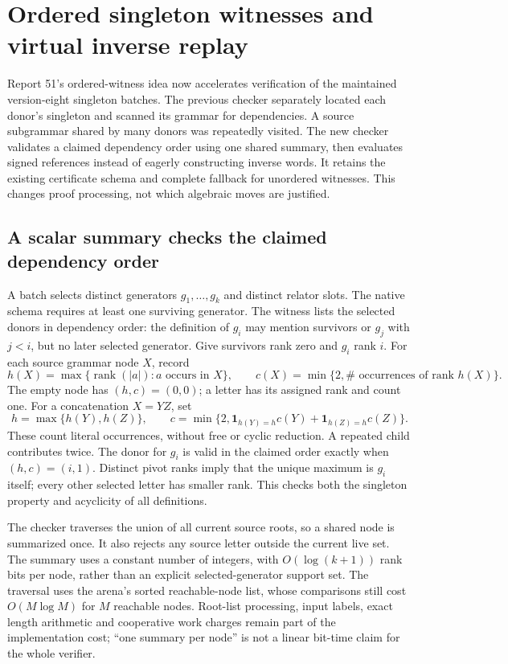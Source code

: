 \section{Ordered singleton witnesses and virtual inverse replay}
\label{sec:ordered-batch}

Report 51's ordered-witness idea now accelerates verification of the maintained
version-eight singleton batches. The previous checker separately located each
donor's singleton and scanned its grammar for dependencies. A source subgrammar
shared by many donors was repeatedly visited. The new checker validates a
claimed dependency order using one shared summary, then evaluates signed
references instead of eagerly constructing inverse words. It retains the
existing certificate schema and complete fallback for unordered witnesses.
This changes proof processing, not which algebraic moves are justified.

\subsection{A scalar summary checks the claimed dependency order}

A batch selects distinct generators $g_1,\ldots,g_k$ and distinct relator slots.
The native schema requires at least one surviving generator. The witness lists
the selected donors in dependency order: the definition of $g_i$ may mention
survivors or $g_j$ with $j<i$, but no later selected generator. Give survivors
rank zero and $g_i$ rank $i$. For each source grammar node $X$, record
\[
 h(X)=\max\{\operatorname{rank}(|a|):a\text{ occurs in }X\},\qquad
 c(X)=\min\{2,\#\text{ occurrences of rank }h(X)\}.
\]
The empty node has $(h,c)=(0,0)$; a letter has its assigned rank and count one.
For a concatenation $X=YZ$, set
\[
 h=\max\{h(Y),h(Z)\},\qquad
 c=\min\{2,\mathbf1_{h(Y)=h}c(Y)+\mathbf1_{h(Z)=h}c(Z)\}.
\]
These count literal occurrences, without free or cyclic reduction. A repeated
child contributes twice. The donor for $g_i$ is valid in the claimed order
exactly when $(h,c)=(i,1)$. Distinct pivot ranks imply that the unique maximum
is $g_i$ itself; every other selected letter has smaller rank. This checks
both the singleton property and acyclicity of all definitions.

The checker traverses the union of all current source roots, so a shared node
is summarized once. It also rejects any source letter outside the current
live set. The summary uses a constant number of integers, with $O(\log(k+1))$
rank bits per node, rather than an explicit selected-generator support set.
The traversal uses the arena's sorted reachable-node list, whose comparisons
still cost $O(M\log M)$ for $M$ reachable nodes. Root-list processing, input
labels, exact length arithmetic and cooperative work charges remain part of
the implementation cost; ``one summary per node'' is not a linear bit-time
claim for the whole verifier.

